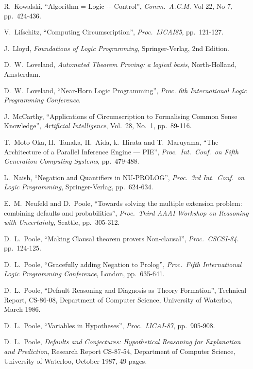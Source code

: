 \begin{thebibliography}{McDer80}
R.~Kowalski, ``Algorithm = Logic + Control'',
{\em Comm.~A.C.M.} Vol 22, No 7, pp.~424-436.

V.~Lifschitz, ``Computing Circumscription'',
{\em Proc.~IJCAI85}, pp.~121-127.

J.~Lloyd, {\em Foundations of Logic Programming},
Springer-Verlag, 2nd Edition.

D.~W.~Loveland, {\em Automated Theorem Proving: a logical basis},
North-Holland, Amsterdam.

D.~W.~Loveland, ``Near-Horn Logic Programming'',
{\em Proc. 6th International Logic Programming Conference}.

J.\ McCarthy, ``Applications of Circumscription to Formalising
Common Sense Knowledge'', {\em Artificial Intelligence}, Vol.\ 28, No.\ 1,
pp.\ 89-116.

T.~Moto-Oka, H.~Tanaka, H.~Aida, k.~Hirata and T.~Maruyama,
``The Architecture of a Parallel Inference Engine --- PIE'',
{\em Proc.\ Int.\ Conf.\ on Fifth Generation Computing Systems},
pp.~479-488.

L.~Naish, ``Negation and Quantifiers in NU-PROLOG'',
{\em Proc.~3rd Int.\ Conf.\ on Logic Programming},
Springer-Verlag, pp.~624-634.

E.\ M.\ Neufeld and D.\ Poole,
``Towards solving the multiple extension problem:
combining defaults and probabilities'',
{\em Proc.\ Third AAAI Workshop on Reasoning with Uncertainty},
Seattle, pp.\ 305-312.

D.\ L.\ Poole,
``Making Clausal theorem provers Non-clausal'',
{\em Proc.\ CSCSI-84}. pp.~124-125.

D.\ L.\ Poole,
``Gracefully adding Negation to Prolog'',
{\em Proc.~Fifth International Logic Programming Conference},
London, pp.~635-641.

D.\ L.\ Poole,
``Default Reasoning and Diagnosis as Theory Formation'',
Technical Report, CS-86-08, Department of Computer Science,
University of Waterloo, March 1986.

D.\ L.\ Poole,
``Variables in Hypotheses'', 
{\em Proc.~IJCAI-87}, pp.\ 905-908.

D.\ L.\ Poole,
{\em Defaults and Conjectures: Hypothetical Reasoning for Explanation and
Prediction}, Research Report CS-87-54, Department of
Computer Science, University of Waterloo, October 1987, 49 pages.


\end{thebibliography}
